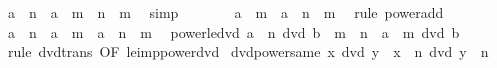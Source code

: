 \begin{isabellebody}
\ {\isachardoublequoteopen}a\ {\isacharcircum}{\kern0pt}\ n\ {\isacharequal}{\kern0pt}\ a\ {\isacharcircum}{\kern0pt}\ {\isacharparenleft}{\kern0pt}m\ {\isacharplus}{\kern0pt}\ {\isacharparenleft}{\kern0pt}n\ {\isacharminus}{\kern0pt}\ m{\isacharparenright}{\kern0pt}{\isacharparenright}{\kern0pt}{\isachardoublequoteclose}\ \isamarkupfalse%
\ simp\isanewline
\ \ \isamarkupfalse%
\ \isamarkupfalse%
\ {\isachardoublequoteopen}{\isasymdots}\ {\isacharequal}{\kern0pt}\ a\ {\isacharcircum}{\kern0pt}\ m\ {\isacharasterisk}{\kern0pt}\ a\ {\isacharcircum}{\kern0pt}\ {\isacharparenleft}{\kern0pt}n\ {\isacharminus}{\kern0pt}\ m{\isacharparenright}{\kern0pt}{\isachardoublequoteclose}\ \isamarkupfalse%
\ {\isacharparenleft}{\kern0pt}rule\ power{\isacharunderscore}{\kern0pt}add{\isacharparenright}{\kern0pt}\isanewline
\ \ \isamarkupfalse%
\ \isamarkupfalse%
\ {\isachardoublequoteopen}a\ {\isacharcircum}{\kern0pt}\ n\ {\isacharequal}{\kern0pt}\ a\ {\isacharcircum}{\kern0pt}\ m\ {\isacharasterisk}{\kern0pt}\ a\ {\isacharcircum}{\kern0pt}\ {\isacharparenleft}{\kern0pt}n\ {\isacharminus}{\kern0pt}\ m{\isacharparenright}{\kern0pt}{\isachardoublequoteclose}\ \isacommand{{\isachardot}{\kern0pt}}\isamarkupfalse%
\isanewline
{}\isamarkupfalse%
%
\endisatagproof
{\isafoldproof}%
%
\isadelimproof
\isanewline
%
\endisadelimproof
\isanewline
{}\isamarkupfalse%
\ power{\isacharunderscore}{\kern0pt}le{\isacharunderscore}{\kern0pt}dvd{\isacharcolon}{\kern0pt}\ {\isachardoublequoteopen}a\ {\isacharcircum}{\kern0pt}\ n\ dvd\ b\ {\isasymLongrightarrow}\ m\ {\isasymle}\ n\ {\isasymLongrightarrow}\ a\ {\isacharcircum}{\kern0pt}\ m\ dvd\ b{\isachardoublequoteclose}\isanewline
%
\isadelimproof
\ \ %
\endisadelimproof
%
\isatagproof
{}\isamarkupfalse%
\ {\isacharparenleft}{\kern0pt}rule\ dvd{\isacharunderscore}{\kern0pt}trans\ {\isacharbrackleft}{\kern0pt}OF\ le{\isacharunderscore}{\kern0pt}imp{\isacharunderscore}{\kern0pt}power{\isacharunderscore}{\kern0pt}dvd{\isacharbrackright}{\kern0pt}{\isacharparenright}{\kern0pt}%
\endisatagproof
{\isafoldproof}%
%
\isadelimproof
\isanewline
%
\endisadelimproof
\isanewline
{}\isamarkupfalse%
\ dvd{\isacharunderscore}{\kern0pt}power{\isacharunderscore}{\kern0pt}same{\isacharcolon}{\kern0pt}\ {\isachardoublequoteopen}x\ dvd\ y\ {\isasymLongrightarrow}\ x\ {\isacharcircum}{\kern0pt}\ n\ dvd\ y\ {\isacharcircum}{\kern0pt}\ n{\isachardoublequoteclose}\isanewline
%
\isadelimproof
\ \ %
\endisadelimproof

\end{isabellebody}
